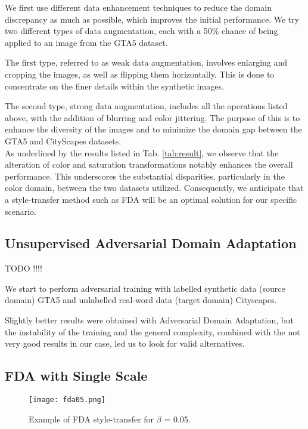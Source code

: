 \documentclass[10pt,twocolumn,letterpaper]{article}
\begin{document}
We first use different data enhancement techniques to reduce the domain discrepancy as much as possible, which improves the initial performance. We try two different types of data augmentation, each with a 50\% chance of being applied to an image from the GTA5 dataset.

The first type, referred to as weak data augmentation, involves enlarging and cropping the images, as well as flipping them horizontally. This is done to concentrate on the finer details within the synthetic images.

The second type, strong data augmentation, includes all the operations listed above, with the addition of blurring and color jittering. The purpose of this is to enhance the diversity of the images and to minimize the domain gap between the GTA5 and CityScapes datasets.\\

As underlined by the results listed in Tab. \ref{tab:result}, we observe that the alteration of color and saturation transformations notably enhances the overall performance. This underscores the substantial disparities, particularly in the color domain, between the two datasets utilized. Consequently, we anticipate that a style-transfer method such as FDA will be an optimal solution for our specific scenario. 

\subsection{Unsupervised Adversarial Domain Adaptation}

TODO !!!!

We start to perform adversarial training with labelled synthetic data (source domain) GTA5 and unlabelled real-word data (target domain) Cityscapes.

Slightly better results were obtained with Adversarial Domain Adaptation, but the instability of the training and the general complexity, combined with the not very good results in our case, led us to look for valid alternatives.

\subsection{FDA with Single Scale}

\begin{figure}[h]
    \centering
    \texttt{[image: fda05.png]}
    \caption{Example of FDA style-transfer for $\beta$ = 0.05.}
    \label{fig:fdastylef}
\end{figure}
\end{document}
